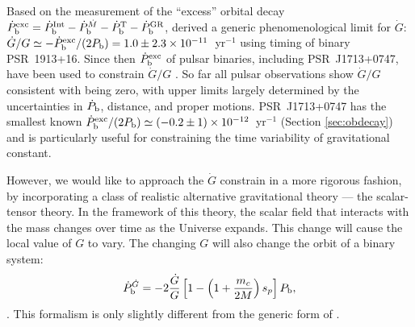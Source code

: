 Based on the measurement of the ``excess'' orbital decay 
$\dot{P}_{\rm b}^{\rm exc}=\dot{P}_{\rm b}^{\rm Int} - \dot{P}_{\rm
b}^{\dot{M}}  - \dot{P}_{\rm b}^{\rm T} - \dot{P}_{\rm b}^{\rm GR}$,
\citet{dgt88} derived a generic phenomenological limit for $\dot{G}$: 
$\dot{G}/G\simeq-\dot{P}_{\rm b}^{\rm exc}/(2P_{\rm
b})=1.0\pm2.3\times10^{-11}$~yr$^{-1}$ using timing of binary PSR~1913+16. 
{\bfref Since then $\dot{P}_{\rm b}^{\rm exc}$ of pulsar binaries, including 
PSR~J1713+0747, have been used to 
constrain $\dot{G}/G$ \citep{ktr94, lwj+09, fwe+12, nss+05}. }
So far all pulsar observations show $\dot{G}/G$ consistent with being zero, with 
upper limits largely determined by the uncertainties in $\dot P_{\rm b}$, distance, 
and proper motions.
PSR~J1713+0747 has the smallest known $\dot{P}_{\rm b}^{\rm exc}/(2P_{\rm
b})\simeq(-0.2\pm1)\times10^{-12}$~yr$^{-1}$ (Section \ref{sec:obdecay}) and is
particularly useful for constraining the time variability of gravitational
constant.

However, we would like to approach the $\dot{G}$ constrain in a more rigorous fashion,
by incorporating a class of realistic alternative gravitational theory --- the 
scalar-tensor theory.
In the framework of this theory,
the scalar field that interacts with the mass changes over time as the
Universe expands. This change will cause the local value of
$G$ to vary. The changing $G$ will also change
the orbit of a binary system:
\begin{equation}
\dot{P}_{\rm b}^{\dot{G}} = -2 \frac{\dot{G}}{G}
\left[1-\left( 1+\frac{m_c}{2M}\right) s_p\right]P_{\rm b},
\end{equation} \citep{nor90}.
This formalism is only slightly different from the generic form of
\citet{dgt88}.

